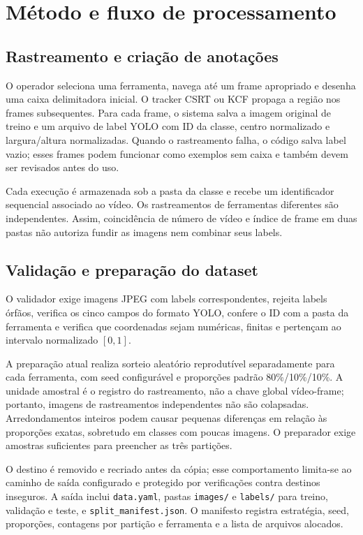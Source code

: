 \documentclass[12pt,a4paper]{article}
\begin{document}
\section{Método e fluxo de processamento}

\subsection{Rastreamento e criação de anotações}

O operador seleciona uma ferramenta, navega até um frame apropriado e desenha uma caixa delimitadora inicial. O tracker CSRT ou KCF propaga a região nos frames subsequentes. Para cada frame, o sistema salva a imagem original de treino e um arquivo de label YOLO com ID da classe, centro normalizado e largura/altura normalizadas. Quando o rastreamento falha, o código salva label vazio; esses frames podem funcionar como exemplos sem caixa e também devem ser revisados antes do uso.

Cada execução é armazenada sob a pasta da classe e recebe um identificador sequencial associado ao vídeo. Os rastreamentos de ferramentas diferentes são independentes. Assim, coincidência de número de vídeo e índice de frame em duas pastas não autoriza fundir as imagens nem combinar seus labels.

\subsection{Validação e preparação do dataset}

O validador exige imagens JPEG com labels correspondentes, rejeita labels órfãos, verifica os cinco campos do formato YOLO, confere o ID com a pasta da ferramenta e verifica que coordenadas sejam numéricas, finitas e pertençam ao intervalo normalizado \([0,1]\).

A preparação atual realiza sorteio aleatório reprodutível separadamente para cada ferramenta, com seed configurável e proporções padrão 80\%/10\%/10\%. A unidade amostral é o registro do rastreamento, não a chave global vídeo-frame; portanto, imagens de rastreamentos independentes não são colapsadas. Arredondamentos inteiros podem causar pequenas diferenças em relação às proporções exatas, sobretudo em classes com poucas imagens. O preparador exige amostras suficientes para preencher as três partições.

O destino é removido e recriado antes da cópia; esse comportamento limita-se ao caminho de saída configurado e protegido por verificações contra destinos inseguros. A saída inclui \texttt{data.yaml}, pastas \texttt{images/} e \texttt{labels/} para treino, validação e teste, e \texttt{split\_manifest.json}. O manifesto registra estratégia, seed, proporções, contagens por partição e ferramenta e a lista de arquivos alocados.
\end{document}
